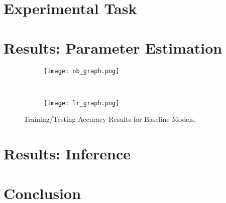 \documentclass{article}
\begin{document}


\section{Experimental Task}
\label{sec:task}



\section{Results: Parameter Estimation}
\label{sec:results-param}


\begin{figure}
  \centering
  \begin{subfigure}[b]{0.47\textwidth}
    \centering
    \texttt{[image: nb\_graph.png]}
    \caption*{}
    \label{fig:nb_graph}
  \end{subfigure}
  ~
  \begin{subfigure}[b]{0.47\textwidth}
    \centering
    \texttt{[image: lr\_graph.png]}
    \caption*{}
    \label{fig:lr_graph}
  \end{subfigure}
  \vspace{-10pt}
  \caption{Training/Testing Accuracy Results for Baseline Models.}
\end{figure}

\section{Results: Inference}
\label{sec:results-inference}


\section{Conclusion}
\label{sec:conclusion}

\end{document}
